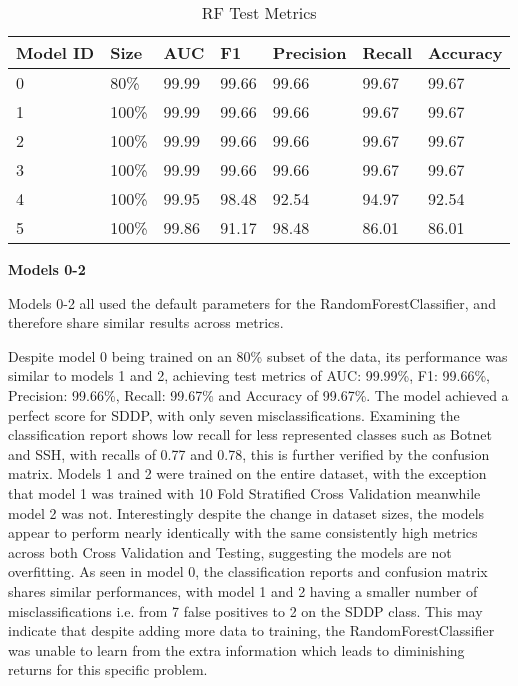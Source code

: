\begin{table}[h]
\centering
\caption{RF Test Metrics}
\label{tab:rf-test-metrics}
\begin{tabular}{|l|l|l|l|l|l|l|}
\hline
\textbf{Model ID} & \textbf{Size} & \textbf{AUC} & \textbf{F1} & \textbf{Precision} & \textbf{Recall} & \textbf{Accuracy}  \\ \hline
0 & 80\% & 99.99 & 99.66 & 99.66 & 99.67 & 99.67 \\ \hline
1 & 100\% & 99.99 & 99.66 & 99.66 & 99.67 & 99.67 \\ \hline
2 & 100\% & 99.99 & 99.66 & 99.66 & 99.67 & 99.67 \\ \hline
3 & 100\% & 99.99 & 99.66 & 99.66 & 99.67 & 99.67 \\ \hline
4 & 100\% & 99.95 & 98.48 &	92.54 & 94.97 &	92.54 \\ \hline
5 & 100\% & 99.86 & 91.17 & 98.48 & 86.01 & 86.01 \\ \hline
\end{tabular}
\end{table}

\textbf{Models 0-2}

\smallskip
Models 0-2 all used the default parameters for the RandomForestClassifier, and therefore share similar results across metrics.

Despite model 0 being trained on an 80\% subset of the data, its performance was similar to models 1 and 2, achieving test metrics of AUC: 99.99\%, F1: 99.66\%, Precision: 99.66\%, Recall: 99.67\% and Accuracy of 99.67\%. The model achieved a perfect score for SDDP, with only seven misclassifications. Examining the classification report shows low recall for less represented classes such as Botnet and SSH, with recalls of 0.77 and 0.78, this is further verified by the confusion matrix. 
Models 1 and 2 were trained on the entire dataset, with the exception that model 1 was trained with 10 Fold Stratified Cross Validation meanwhile model 2 was not. Interestingly despite the change in dataset sizes, the models appear to perform nearly identically with the same consistently high metrics across both Cross Validation and Testing, suggesting the models are not overfitting. As seen in model 0, the classification reports and confusion matrix shares similar performances, with model 1 and 2 having a smaller number of misclassifications i.e. from 7 false positives to 2 on the SDDP class. This may indicate that despite adding more data to training, the RandomForestClassifier was unable to learn from the extra information which leads to diminishing returns for this specific problem. 
 
